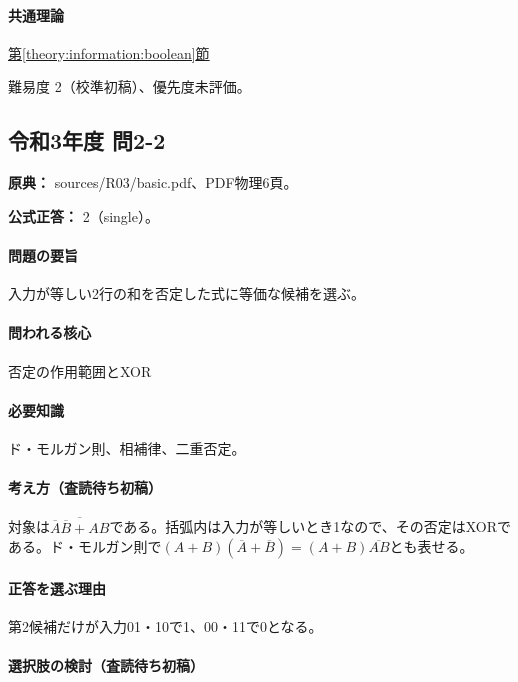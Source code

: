 \paragraph{共通理論} \hyperref[theory:information:boolean]{第\ref*{theory:information:boolean}節}

\par 難易度 2（校準初稿）、優先度未評価。

\subsection{令和3年度 問2-2}
\label{q:r03-reg-basic-2-2}

\noindent\textbf{原典：} sources/R03/basic.pdf、PDF物理6頁。

\textbf{公式正答：} 2（single）。

\paragraph{問題の要旨} 入力が等しい2行の和を否定した式に等価な候補を選ぶ。

\paragraph{問われる核心} 否定の作用範囲とXOR

\paragraph{必要知識} ド・モルガン則、相補律、二重否定。

\paragraph{考え方（査読待ち初稿）} 対象は\(\overline{\overline A\overline B+AB}\)である。括弧内は入力が等しいとき1なので、その否定はXORである。ド・モルガン則で\((A+B)(\overline A+\overline B)=(A+B)\overline{AB}\)とも表せる。

\paragraph{正答を選ぶ理由} 第2候補だけが入力01・10で1、00・11で0となる。

\paragraph{選択肢の検討（査読待ち初稿）}\mbox{}\par


